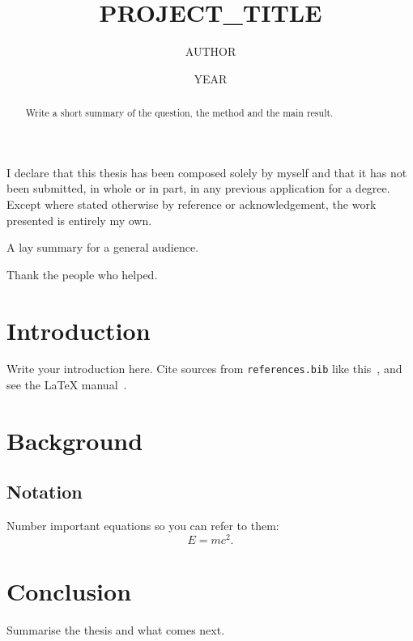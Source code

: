 \documentclass[12pt,twoside]{report}
\title{{{PROJECT_TITLE}}}
\author{{{AUTHOR}}}
\date{{{YEAR}}}
\begin{document}
\flushbottom
{}
\maketitle

\begin{declaration}
{I declare that this thesis has been composed solely by myself and that it has
not been submitted, in whole or in part, in any previous application for a
degree. Except where stated otherwise by reference or acknowledgement, the work
presented is entirely my own.}
\end{declaration}

\begin{abstract}
Write a short summary of the question, the method and the main result.
\end{abstract}

\begin{laysummary}
A lay summary for a general audience.
\end{laysummary}

\begin{acknowledgements}
Thank the people who helped.
\end{acknowledgements}

\tableofcontents
\newpage
{}

\chapter{Introduction}
Write your introduction here. Cite sources from \texttt{references.bib} like
this~\cite{einstein1905}, and see the \LaTeX{} manual~\cite{lamport1994}.

\chapter{Background}
\section{Notation}
Number important equations so you can refer to them:
\begin{equation}
  E = mc^2 . \label{eq:energy}
\end{equation}

\chapter{Conclusion}
Summarise the thesis and what comes next.



\end{document}
